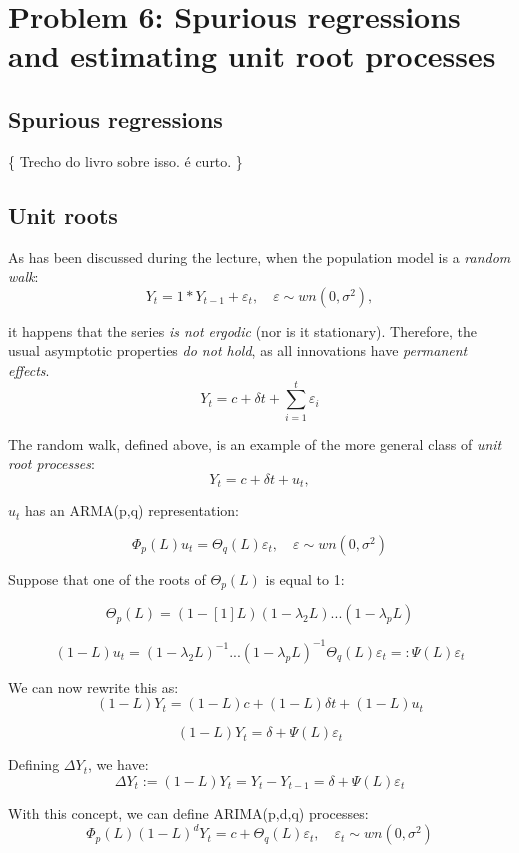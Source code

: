 \documentclass[11pt, a4paper]{report}
\theoremstyle{plain}
\theoremstyle{plain}
\theoremstyle{remark}
\begin{document}
\chapter{Problem 6: Spurious regressions and estimating unit root processes}

\section{Spurious regressions}

\{ Trecho do livro sobre isso. é curto. \}

\section{Unit roots}

As has been discussed during the lecture, when the population model is a
\emph{random walk}:
\[ Y_t = 1*Y_{t-1} + \varepsilon_t, \hspace{1em} \varepsilon \sim wn(0, \sigma^2), \]

it happens that the series \emph{is not ergodic} (nor is it stationary).
Therefore, the usual asymptotic properties \emph{do not hold}, as all
innovations have \emph{permanent effects}.
\[ Y_t = c + \delta t + \sum_{i=1}^t \varepsilon_i \]

The random walk, defined above, is an example of the more general class
of \emph{unit root processes}: \[ Y_t = c + \delta t + u_t,\]

\(u_t\) has an ARMA(p,q) representation:

\[ \Phi_p (L) u_t = \Theta_q (L) \varepsilon_t, \hspace{1em} \varepsilon \sim wn(0, \sigma^2)\]

Suppose that one of the roots of \(\Theta_p (L)\) is equal to 1:

\[ \Theta_p (L) = (1 - [1]L)(1 - \lambda_2 L)...(1 - \lambda_p L)\]

\[ (1 - L)u_t = (1 - \lambda_2 L)^{-1} ... (1 - \lambda_p L)^{-1} \Theta_q (L) \varepsilon_t =: \Psi(L) \varepsilon_t \]

We can now rewrite this as:
\[ (1- L)Y_t = (1-L)c + (1-L)\delta t + (1-L)u_t \]

\[ (1 - L)Y_t = \delta + \Psi (L) \varepsilon_t \]

Defining \(\Delta Y_t\), we have:
\[ \Delta Y_t := (1 - L)Y_t = Y_t - Y_{t-1} = \delta + \Psi (L) \varepsilon_t \]

With this concept, we can define ARIMA(p,d,q) processes:
\[ \Phi_p (L) (1-L)^d Y_t = c + \Theta_q (L) \varepsilon_t, \hspace{1em} \varepsilon_t \sim wn(0, \sigma^2) \]
\end{document}
